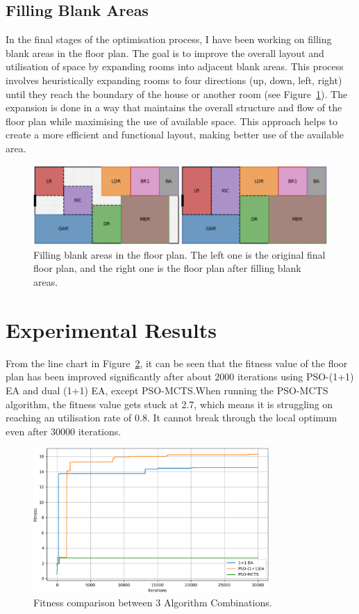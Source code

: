 \documentclass[]{article}
\begin{document}
\subsection{Filling Blank Areas}
In the final stages of the optimisation process, I have been working on filling blank areas in the floor plan. The goal is to improve the overall layout and utilisation of space by expanding rooms into adjacent blank areas. This process involves heuristically expanding rooms to four directions (up, down, left, right) until they reach the boundary of the house or another room (see Figure~\ref{fig:fill-blank}). The expansion is done in a way that maintains the overall structure and flow of the floor plan while maximising the use of available space. This approach helps to create a more efficient and functional layout, making better use of the available area.
\begin{figure}[h]
    \centering
    \includegraphics[width=1\textwidth]{images/fill-blank.png}
    \caption{Filling blank areas in the floor plan. The left one is the original final floor plan, and the right one is the floor plan after filling blank areas.}
    \label{fig:fill-blank}
\end{figure}

\section{Experimental Results}
From the line chart in Figure~\ref{fig:compare-3algorithm}, it can be seen that the fitness value of the floor plan has been improved significantly after about 2000 iterations using PSO-(1+1) EA and dual (1+1) EA, except PSO-MCTS.\@ When running the PSO-MCTS algorithm, the fitness value gets stuck at 2.7, which means it is struggling on reaching an utilisation rate of 0.8. It cannot break through the local optimum even after 30000 iterations.
\begin{figure}[h]
    \centering
    \includegraphics[width=0.8\textwidth]{images/compare-3algorithm.png}
    \caption{Fitness comparison between 3 Algorithm Combinations.}
    \label{fig:compare-3algorithm}
\end{figure}
\end{document}
